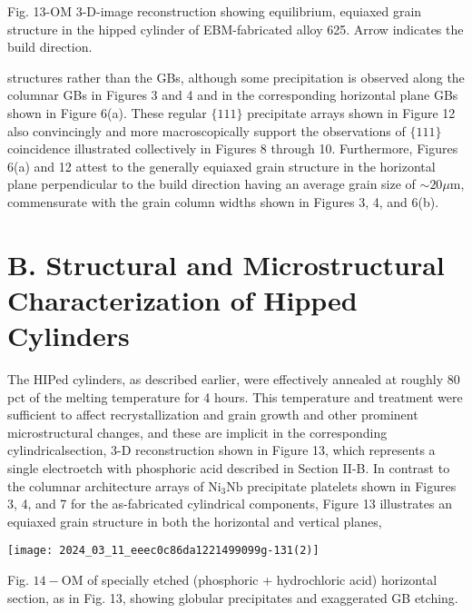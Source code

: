 \documentclass[10pt]{article}
\begin{document}
Fig. 13-OM 3-D-image reconstruction showing equilibrium, equiaxed grain structure in the hipped cylinder of EBM-fabricated alloy 625. Arrow indicates the build direction.

structures rather than the GBs, although some precipitation is observed along the columnar GBs in Figures 3 and 4 and in the corresponding horizontal plane GBs shown in Figure 6(a). These regular $\{111\}$ precipitate arrays shown in Figure 12 also convincingly and more macroscopically support the observations of $\{111\}$ coincidence illustrated collectively in Figures 8 through 10. Furthermore, Figures 6(a) and 12 attest to the generally equiaxed grain structure in the horizontal plane perpendicular to the build direction having an average grain size of $\sim 20 \mu \mathrm{m}$, commensurate with the grain column widths shown in Figures 3, 4, and 6(b).

\section*{B. Structural and Microstructural Characterization of Hipped Cylinders}
The HIPed cylinders, as described earlier, were effectively annealed at roughly 80 pct of the melting temperature for 4 hours. This temperature and treatment were sufficient to affect recrystallization and grain growth and other prominent microstructural changes, and these are implicit in the corresponding cylindricalsection, 3-D reconstruction shown in Figure 13, which represents a single electroetch with phosphoric acid described in Section II-B. In contrast to the columnar architecture arrays of $\mathrm{Ni}_{3} \mathrm{Nb}$ precipitate platelets shown in Figures 3, 4, and 7 for the as-fabricated cylindrical components, Figure 13 illustrates an equiaxed grain structure in both the horizontal and vertical planes,

\begin{center}
\texttt{[image: 2024\_03\_11\_eeec0c86da1221499099g-131(2)]}
\end{center}

Fig. $14-\mathrm{OM}$ of specially etched (phosphoric + hydrochloric acid) horizontal section, as in Fig. 13, showing globular precipitates and exaggerated GB etching.
\end{document}

